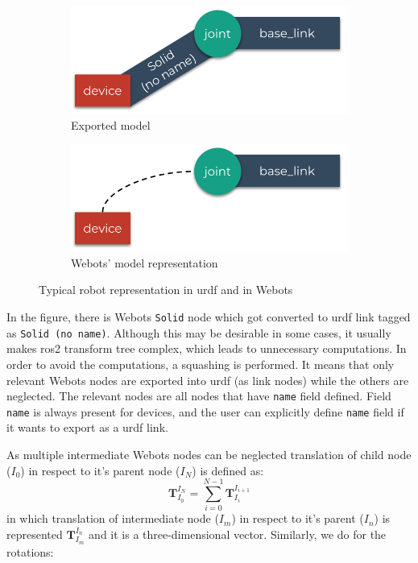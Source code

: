 \begin{figure}[H]
\centering
\begin{subfigure}{\textwidth}
  \centering
  \includegraphics[width=.7\linewidth]{generalization/figures/squashing_transforms_actual.pdf}
  \caption{Exported model}
  \label{fig:generalization:squashing_transforms:actual}
\end{subfigure}
\begin{subfigure}{\textwidth}
  \centering
  \includegraphics[width=.7\linewidth]{generalization/figures/squashing_transforms_desired.pdf}
  \caption{Webots' model representation}
  \label{fig:generalization:squashing_transforms:desired}
\end{subfigure}
\caption{Typical robot representation in \ac{urdf} and in Webots}
\label{fig:generalization:squashing_transforms}
\end{figure}

In the figure, there is Webots \texttt{Solid} node which got converted to \ac{urdf} link tagged as \texttt{Solid (no name)}. 
Although this may be desirable in some cases, it usually makes \ac{ros2} transform tree complex, which leads to unnecessary computations.
In order to avoid the computations, a squashing is performed.
It means that only relevant Webots nodes are exported into \ac{urdf} (as link nodes) while the others are neglected.
The relevant nodes are all nodes that have \texttt{name} field defined.
Field \texttt{name} is always present for devices, and the user can explicitly define \texttt{name} field if it wants to export as a \ac{urdf} link.

As multiple intermediate Webots nodes can be neglected translation of child node ($I_0$) in respect to it's parent node ($I_N$) is defined as:
\begin{equation}
    \bm{T}_{I_0}^{I_N} = \sum_{i=0}^{N-1} \bm{T}_{I_i}^{I_{i+1}}
\end{equation}
in which translation of intermediate node ($I_m$) in respect to it's parent ($I_n$) is represented $ \bm{T}_{I_m}^{I_n} $ and it is a three-dimensional vector.
Similarly, we do for the rotations:

